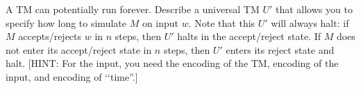   A TM can potentially run forever.
  Describe a universal TM $U'$
  that allows you to specify how long to
  simulate $M$ on input $w$.
  Note that this $U'$ will always halt:
  if $M$ accepts/rejects $w$ in $n$ steps, then $U'$ halts in the
  accept/reject state.
  If $M$ does not enter its accept/reject state in $n$ steps,
  then $U'$ enters its reject state and halt.
  [HINT: For the input, you need the encoding of the
  TM, encoding of the input, and encoding of \lq\lq time''.]
